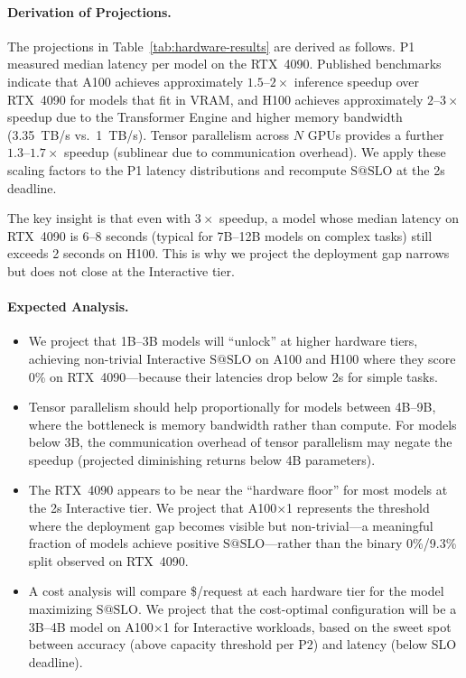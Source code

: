\documentclass[11pt]{article}
\makeatletter
\newcommand{\sslo}{\ensuremath{\mathrm{S@SLO}}}
\makeatother
\begin{document}
\paragraph{Derivation of Projections.}

The projections in Table~\ref{tab:hardware-results} are derived as follows. P1 measured median latency per model on the RTX~4090. Published benchmarks indicate that A100 achieves approximately $1.5$--$2\times$ inference speedup over RTX~4090 for models that fit in VRAM, and H100 achieves approximately $2$--$3\times$ speedup due to the Transformer Engine and higher memory bandwidth (3.35~TB/s vs.\ 1~TB/s). Tensor parallelism across $N$ GPUs provides a further $1.3$--$1.7\times$ speedup (sublinear due to communication overhead). We apply these scaling factors to the P1 latency distributions and recompute $\sslo{}$ at the 2s deadline.

The key insight is that even with $3\times$ speedup, a model whose median latency on RTX~4090 is 6--8 seconds (typical for 7B--12B models on complex tasks) still exceeds 2 seconds on H100. This is why we project the deployment gap narrows but does not close at the Interactive tier.

\paragraph{Expected Analysis.}

\begin{itemize}[leftmargin=16pt]
    \item We project that 1B--3B models will ``unlock'' at higher hardware tiers, achieving non-trivial Interactive $\sslo{}$ on A100 and H100 where they score 0\% on RTX~4090---because their latencies drop below 2s for simple tasks.
    \item Tensor parallelism should help proportionally for models between 4B--9B, where the bottleneck is memory bandwidth rather than compute. For models below 3B, the communication overhead of tensor parallelism may negate the speedup (projected diminishing returns below 4B parameters).
    \item The RTX~4090 appears to be near the ``hardware floor'' for most models at the 2s Interactive tier. We project that A100$\times$1 represents the threshold where the deployment gap becomes visible but non-trivial---a meaningful fraction of models achieve positive $\sslo{}$---rather than the binary 0\%/9.3\% split observed on RTX~4090.
    \item A cost analysis will compare \$/request at each hardware tier for the model maximizing $\sslo{}$. We project that the cost-optimal configuration will be a 3B--4B model on A100$\times$1 for Interactive workloads, based on the sweet spot between accuracy (above capacity threshold per P2) and latency (below SLO deadline).
\end{itemize}
\end{document}
